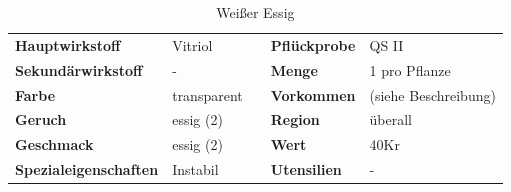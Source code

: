 \begin{table}[h] 
\begin{center} 
\begin{tabular}{|l|l|p{1cm}|l|l|} 
  	\cline{1-2} \cline{4-5} 
  	\textbf{Hauptwirkstoff} & Vitriol && \textbf{Pflückprobe} & QS II \\ \cline{1-2} \cline{4-5} 
  	\textbf{Sekundärwirkstoff} & - && \textbf{Menge} & 1 pro Pflanze \\ \cline{1-2} \cline{4-5} 
  	\textbf{Farbe} & transparent && \textbf{Vorkommen} & (siehe Beschreibung) \\ \cline{1-2} \cline{4-5} 
  	\textbf{Geruch} & essig (2) && \textbf{Region} & überall \\ \cline{1-2} \cline{4-5} 
  	\textbf{Geschmack} & essig (2) && \textbf{Wert} & 40Kr \\ \cline{1-2} \cline{4-5} 
  	\textbf{Spezialeigenschaften} & Instabil && \textbf{Utensilien} & - \\ \cline{1-2} \cline{4-5} 
\end{tabular} 
\end{center} 
\caption{Weißer Essig} 
\label{tab:weisser_essig} 
\end{table}